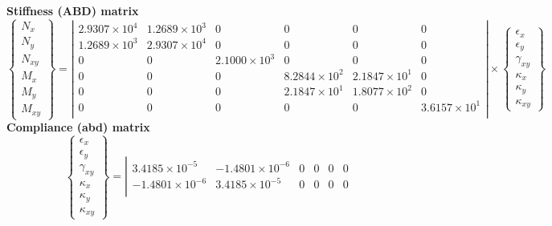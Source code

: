 \begin{table}[!htbp]
  \vbox{
    \vbox{\small\textbf{Stiffness (ABD) matrix}\\[-5mm]
      \tiny\[\left\{\begin{array}{c}
          N_x\\ N_y\\ N_{xy}\\ M_x\\ M_y\\ M_{xy}
        \end{array}\right\} = 
      \left|\begin{array}{cccccc}
           2.9307\times 10^{4} &  1.2689\times 10^{3} & 0 & 0 & 0 & 0\\
           1.2689\times 10^{3} &  2.9307\times 10^{4} & 0 & 0 & 0 & 0\\
          0 & 0 &  2.1000\times 10^{3} & 0 & 0 & 0\\
          0 & 0 & 0 &  8.2844\times 10^{2} &  2.1847\times 10^{1} & 0\\
          0 & 0 & 0 &  2.1847\times 10^{1} &  1.8077\times 10^{2} & 0\\
          0 & 0 & 0 & 0 & 0 &  3.6157\times 10^{1}\\
          \end{array}\right| \times
        \left\{\begin{array}{c}
            \epsilon_x\\[3pt] \epsilon_y\\[3pt] \gamma_{xy}\\[3pt]
            \kappa_x\\[3pt] \kappa_y\\[3pt] \kappa_{xy}
          \end{array}\right\}\]
    }
    \vbox{\small\textbf{Compliance (abd) matrix}\\[-5mm]
      \tiny\[\left\{\begin{array}{c}
            \epsilon_x\\[3pt] \epsilon_y\\[3pt] \gamma_{xy}\\[3pt]
            \kappa_x\\[3pt] \kappa_y\\[3pt] \kappa_{xy}
          \end{array}\right\} = \left|\begin{array}{cccccc}
           3.4185\times 10^{-5} & -1.4801\times 10^{-6} & 0 & 0 & 0 & 0\\
          -1.4801\times 10^{-6} &  3.4185\times 10^{-5} & 0 & 0 & 0 & 0\\

\end{array}\]}}
\end{table}
